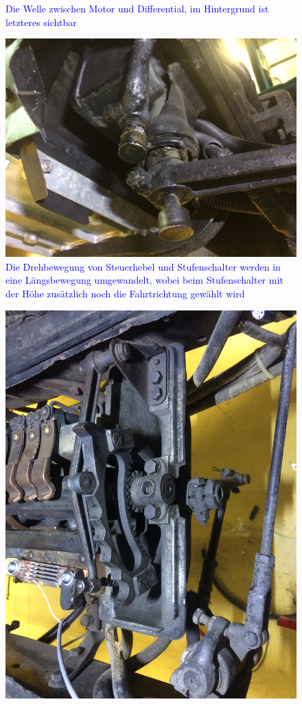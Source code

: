 \begin{landscape}
\begin{figure}[h]
	\caption{\textcolor{blue}{Die Welle zwischen Motor und Differential, im Hintergrund ist letzteres sichtbar}}
	\label{fig:Differential}
\end{figure}
\begin{figure}[h]
	\centering
		\includegraphics[width=1.30\textwidth]{images/Anhang/Lenkung_Stufenschalter.jpg}
	\caption{\textcolor{blue}{Die Drehbewegung von Steuerhebel und Stufenschalter werden in eine Längsbewegung umgewandelt, wobei beim Stufenschalter mit der Höhe zusätzlich noch die Fahrtrichtung gewählt wird}}
	\label{fig:Lenkung_Stufenschalter}
\end{figure}
\begin{figure}[h]
	\centering
		\includegraphics[angle=180,width=1.30\textwidth]{images/Anhang/Stufenschalter_2.jpg}

\end{figure}
\end{landscape}
